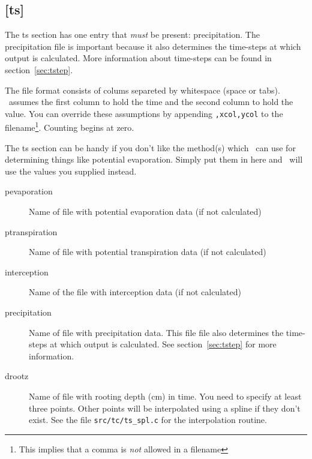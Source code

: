 \subsection{[ts]}\label{section:ts}
The ts section has one entry that {\em must} be present:
precipitation.  The precipitation file is important because it also
determines the time-steps at which output is calculated. More
information about time-steps can be found in
section~\ref{sec:tstep}. 
\begin{figure}
\end{figure}

The file format consists of colums separeted by whitespace (space
or tabs).  \vamps\ assumes the first column to hold the time and the
second column to hold the value. You can override these assumptions by
appending {\tt ,xcol,ycol} to the filename\footnote{This implies that a comma
is {\em not} allowed in a filename}. Counting begins at zero.

The ts section can be handy if you don't like the method(s) which
\vamps\ can use for determining things like potential evaporation.
Simply put them in here and \vamps\ will use the values you supplied
instead.

\begin{description}
\item[pevaporation]
Name of file with potential evaporation data (if not calculated)

\item[ptranspiration]
Name of file with potential transpiration data (if not calculated)

\item[interception]
Name of the file with interception data (if not calculated)

\item[precipitation]
Name of file with precipitation data. This file file also determines
the time-steps at which output is calculated. See section~\ref{sec:tstep}
for more information.

\item[drootz]
Name of file with rooting depth (cm) in time. You need to specify at
least three points. Other points will be interpolated using a spline
if they don't exist. See the file {\tt src/tc/ts\_spl.c} for the
interpolation routine.
\end{description}

